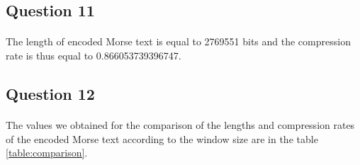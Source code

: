 \documentclass[a4paper, 11pt, oneside]{article}
\begin{document}
\subsection{Question 11}
\paragraph{}The length of encoded Morse text is equal to 2769551 bits and the compression rate is thus equal to 0.866053739396747.

\subsection{Question 12}

\paragraph{}The values we obtained for the comparison of the lengths and compression rates of the encoded Morse text according to the window size are in the table \ref{table:comparison}.
\end{document}
